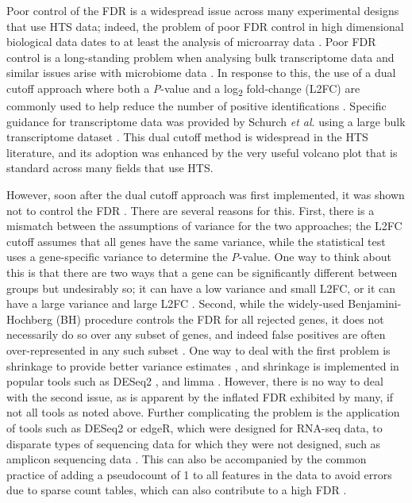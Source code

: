 \documentclass[10pt,letterpaper]{article}
\begin{document}
Poor control of the FDR is a widespread issue across many experimental designs that use HTS data; indeed, the problem of poor FDR control in high dimensional biological data dates to at least the analysis of microarray data \cite{Cui:2003aa}. Poor FDR control is a long-standing problem when analysing bulk transcriptome data \cite{Soneson:2013, li_exaggerated_2022} and similar issues arise with microbiome data \cite{hawinkel2017, Nearing:2022aa}. In response to this, the use of a dual cutoff approach where both a \textit{P}-value and a log\textsubscript{2} fold-change (L2FC) are commonly used to help reduce the number of positive identifications \cite{Cui:2003aa}. Specific guidance for transcriptome data was provided by Schurch \textit{et al}. using a large bulk transcriptome dataset \cite{schurch_how_2016}. This dual cutoff method is widespread in the HTS literature, and its adoption was enhanced by the very useful volcano plot \cite{Cui:2003aa} that is  standard across many fields that use HTS.

However, soon after the dual cutoff approach was first implemented, it was shown not to control the FDR \cite{witten2007comparison, Zhang:2009aa}. There are several reasons for this. First, there is a mismatch between the assumptions of variance for the two approaches; the L2FC cutoff assumes that all genes have the same variance, while the statistical test uses a gene-specific variance to determine the \textit{P}-value. One way to think about this is that there are two ways that a gene can be significantly different between groups but undesirably so; it can have a low variance and small L2FC, or it can have a large variance and large L2FC \cite{ebrahimpoor_inflated_2021}. Second, while the widely-used Benjamini-Hochberg \cite{benjamini:1995} (BH) procedure controls the FDR for all rejected genes, it does not necessarily do so over any subset of genes, and indeed false positives are often over-represented in any such subset \cite{Goeman:2014aa, ebrahimpoor_inflated_2021}. One way to deal with the first problem is shrinkage to provide better variance estimates \cite{Zhang:2009aa}, and shrinkage is implemented in popular tools such as DESeq2 \cite{love_moderated_2014}, and limma \cite{ritchie_limma_2015}. However, there is no way to deal with the second issue, as is apparent by the inflated FDR exhibited by many, if not all tools as noted above. Further complicating the problem is the application of tools such as DESeq2 or edgeR, which were designed for RNA-seq data, to disparate types of sequencing data for which they were not designed, such as amplicon sequencing data \cite{Nearing:2022aa, regueira-iglesias_critical_2023, yang_comprehensive_2022}. This can also be accompanied by the common practice of adding a pseudocount of 1 to all features in the data to avoid errors due to sparse count tables, which can also contribute to a high FDR \cite{weiss_normalization_2017}.
\end{document}
